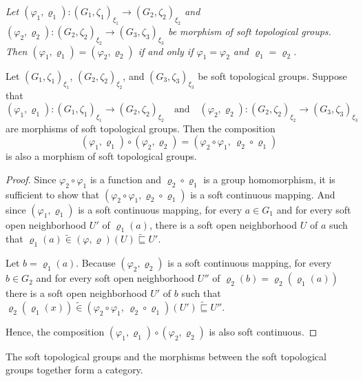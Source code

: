 \documentclass[preprint,12pt]{elsarticle}
\begin{document}
\begin{defn}\em{
Let $(\varphi_1,\varrho_1) :  (G_1,\zeta_1 )_{\xi_1}  \rightarrow  (G_2,\zeta_2 )_{\xi_2} $ and $ (\varphi_2,\varrho_2) : (G_2,\zeta_2 )_{\xi_2}\rightarrow (G_3,\zeta_3 )_{\xi_3} $ be morphism of soft topological groups. Then $(\varphi_1,\varrho_1)=(\varphi_2,\varrho_2)$ if and only if $\varphi_1=\varphi_2$ and $\varrho_1=\varrho_2$.}
\end{defn}

\begin{prop}
Let \( (G_1,\zeta_1 )_{\xi_1} \), \( (G_2,\zeta_2 )_{\xi_2} \), and \( (G_3,\zeta_3 )_{\xi_3} \) be soft topological groups. Suppose that
\[(\varphi_1,\varrho_1) :  (G_1,\zeta_1 )_{\xi_1}  \rightarrow  (G_2,\zeta_2 )_{\xi_2} \quad \text{and} \quad
(\varphi_2,\varrho_2) : (G_2,\zeta_2 )_{\xi_2}\rightarrow (G_3,\zeta_3 )_{\xi_3}
\]
are morphisms of soft topological groups. Then the composition
\[
(\varphi_1,\varrho_1) \circ (\varphi_2,\varrho_2) = (\varphi_2\circ \varphi_1,\, \varrho_2 \circ \varrho_1)
\]
is also a morphism of soft topological groups.
\end{prop}
\begin{proof}
 Since \( \varphi_2\circ \varphi_1 \) is a function and \( \varrho_2 \circ \varrho_1 \) is a group homomorphism,
it is sufficient to show that \((\varphi_2\circ \varphi_1, \varrho_2 \circ \varrho_1)\) is a soft continuous mapping. And since \( (\varphi_1, \varrho_1) \) is a soft continuous mapping, for every \( a \in G_1 \) and for every soft open  neighborhood \( U' \) of \( \varrho_1(a) \),
there is a soft open neighborhood \( U \) of \( a \) such that \(
\varrho_1(a) \widetilde{\in} (\varphi ,\varrho)(U) \widetilde{\sqsubseteq} U'\).

Let \( b = \varrho_1(a) \). Because \((\varphi_2, \varrho_2)\) is a soft continuous mapping, for every \( b \in G_2 \) and for every  soft open neighborhood \( U'' \)  of \( \varrho_2(b)=\varrho_2(\varrho_1(a)) \) there is a soft open neighborhood \(U'\) of \(b\) such that
\(\varrho_2(\varrho_1(x)) \widetilde{\in} (\varphi_2\circ \varphi_1,\, \varrho_2 \circ \varrho_1)(U') \widetilde{\sqsubseteq} U''.\)

Hence, the composition $(\varphi_1,\varrho_1) \circ (\varphi_2,\varrho_2)$ is also soft continuous.

\end{proof}
\begin{thm}
The soft topological groups and the morphisms between the soft topological groups together form a category.
\end{thm}
\end{document}

